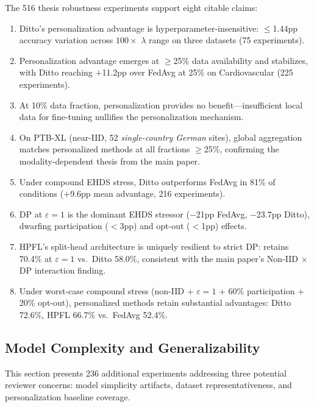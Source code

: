 \documentclass[conference]{IEEEtran}
\begin{document}
The 516 thesis robustness experiments support eight citable claims:

\begin{enumerate}
    \item Ditto's personalization advantage is hyperparameter-insensitive: $\leq$1.44pp accuracy variation across $100\times$ $\lambda$ range on three datasets (75 experiments).
    \item Personalization advantage emerges at $\geq$25\% data availability and stabilizes, with Ditto reaching $+$11.2pp over FedAvg at 25\% on Cardiovascular (225 experiments).
    \item At 10\% data fraction, personalization provides no benefit---insufficient local data for fine-tuning nullifies the personalization mechanism.
    \item On PTB-XL (near-IID, 52 \emph{single-country German} sites), global aggregation matches personalized methods at all fractions $\geq$25\%, confirming the modality-dependent thesis from the main paper.
    \item Under compound EHDS stress, Ditto outperforms FedAvg in 81\% of conditions ($+$9.6pp mean advantage, 216 experiments).
    \item DP at $\varepsilon{=}1$ is the dominant EHDS stressor ($-$21pp FedAvg, $-$23.7pp Ditto), dwarfing participation ($<$3pp) and opt-out ($<$1pp) effects.
    \item HPFL's split-head architecture is uniquely resilient to strict DP: retains 70.4\% at $\varepsilon{=}1$ vs.\ Ditto 58.0\%, consistent with the main paper's Non-IID $\times$ DP interaction finding.
    \item Under worst-case compound stress (non-IID + $\varepsilon{=}1$ + 60\% participation + 20\% opt-out), personalized methods retain substantial advantages: Ditto 72.6\%, HPFL 66.7\% vs.\ FedAvg 52.4\%.
\end{enumerate}


\subsection{Model Complexity and Generalizability}
\label{sec:model_complexity}

This section presents 236 additional experiments addressing three potential reviewer concerns: model simplicity artifacts, dataset representativeness, and personalization baseline coverage.
\end{document}
